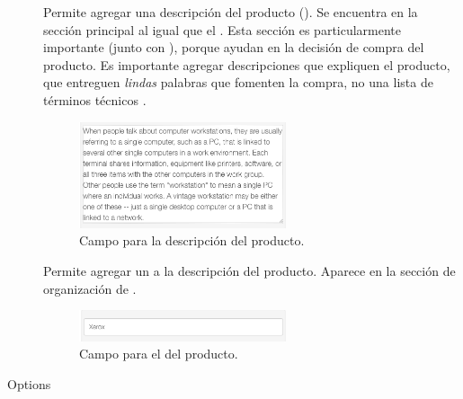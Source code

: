 \begin{description}
			\item [\descriptionForm]
				Permite agregar una descripción del producto (). Se encuentra en la sección principal al igual que el \titleForm {}. Esta sección es particularmente importante (junto con \multimediaForm), porque ayudan en la decisión de compra del producto. Es importante agregar descripciones que expliquen el producto, que entreguen \textit{lindas} palabras que fomenten la compra, no una lista de términos técnicos \cite{online_cxpartners_official_people_see_to_buy}.

				\begin{figure}[H]
					\centering
					\includegraphics[width=0.6\textwidth]{figuras/productos/details/write/component_description.png}

					\caption{Campo para la descripción del producto.}
					\label{figure:productos:details:write:component_description}
				\end{figure}

			\item [\vendorForm]
				Permite agregar un \vendorForm a la descripción del producto. Aparece en la sección de organización de \shopifyNAME {}.

				\begin{figure}[H]
					\centering
					\includegraphics[width=0.6\textwidth]{figuras/productos/details/write/component_vendor.png}

					\caption{Campo para el \vendorForm del producto.}
					\label{figure:productos:details:write:component_vendor}
				\end{figure}

			\item [Options]
				

\end{description}
